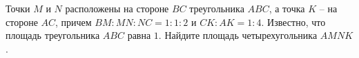 \begin{ex}
	\begin{condition}
		Точки \( M  \) и \( N  \) расположены на стороне \( BC  \) треугольника \( ABC \), а точка \( K \) – на стороне \( AC \), причем \( BM : MN : NC = 1 : 1 : 2  \) и \( CK : AK = 1 : 4 \). Известно, что площадь треугольника \( ABC  \) равна \( 1 \). Найдите	площадь четырехугольника \( AMNK \).
	\end{condition}
\end{ex}